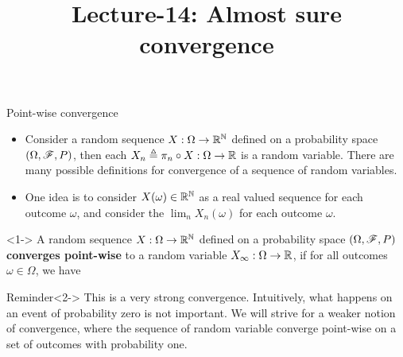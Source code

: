 \documentclass[12pt,aspectratio=169]{beamer}
\title{Lecture-14: Almost sure convergence}%
\date{}
\begin{document}
\pagestyle{empty}
\maketitle

\begin{frame}{Point-wise convergence}
\begin{itemize}
\item <1-> Consider a random sequence $X:\Omega\to\mathbb{R}^{\mathbb{N}}$ defined on a probability space $(\Omega, \mathscr{F}, P)$, 
then each $X_n \triangleq \pi_n\circ X: \Omega \to \mathbb{R}$ is a random variable. 
There are many possible definitions for convergence of a sequence of random variables. 
\item <2-> One idea is to consider $X(\omega)\in \mathbb{R}^{\mathbb{N}}$ as a real valued sequence for each outcome $\omega$, 
and consider the $\lim_nX_n(\omega)$ for each outcome $\omega$. 
\end{itemize}
\end{frame}

\begin{frame}
\begin{Definition}<1->
A random sequence $X:\Omega\to\mathbb{R}^{\mathbb{N}}$ defined on a probability space $(\Omega, \mathscr{F}, P)$ \textbf{converges point-wise} to a random variable $X_\infty:\Omega \to \mathbb{R}$, if for all outcomes $\omega \in \Omega$, we have 
\end{Definition}
\begin{block}{Reminder}<2-> 
This is a very strong convergence. 
Intuitively, what happens on an event of probability zero is not important. 
We will strive for a weaker notion of convergence, 
where the sequence of random variable converge point-wise on a set of outcomes with probability one.
\end{block}
\end{frame}
\end{document}
